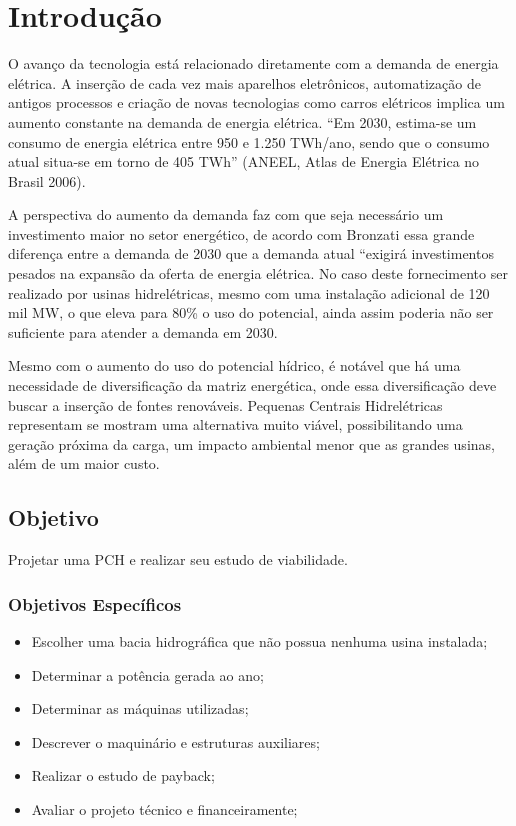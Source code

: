 
\chapter[Introdução]{Introdução}

O avanço da tecnologia está relacionado diretamente com a demanda de energia elétrica. A inserção de cada vez mais aparelhos eletrônicos, automatização de antigos processos e criação de novas tecnologias como carros elétricos implica um aumento constante na demanda de energia elétrica. “Em 2030, estima-se um consumo de energia elétrica entre 950 e 1.250 TWh/ano, sendo que o consumo atual situa-se em torno de 405 TWh” (ANEEL, Atlas de Energia Elétrica no Brasil 2006).

A perspectiva do aumento da demanda faz com que seja necessário um investimento maior no setor energético, de acordo com Bronzati essa grande diferença entre a demanda de 2030 que a demanda atual “exigirá investimentos pesados na expansão da oferta de energia elétrica. No caso deste fornecimento ser realizado por usinas hidrelétricas, mesmo com uma instalação adicional de 120 mil MW, o que eleva para 80\% o uso do potencial, ainda assim poderia não ser suficiente para atender a demanda em 2030.

Mesmo com o aumento do uso do potencial hídrico, é notável que há uma necessidade de diversificação da matriz energética, onde essa diversificação deve buscar a inserção de fontes renováveis. Pequenas Centrais Hidrelétricas representam se mostram uma alternativa muito viável, possibilitando uma geração próxima da carga, um impacto ambiental menor que as grandes usinas, além de um maior custo.



\section{Objetivo}\label{sec:obj}
Projetar uma PCH e realizar seu estudo de viabilidade.

\subsection{Objetivos Específicos}
\begin{itemize}
\item Escolher uma bacia hidrográfica que não possua nenhuma usina instalada;
\item Determinar a potência gerada ao ano;
\item Determinar as máquinas utilizadas;
\item Descrever o maquinário e estruturas auxiliares;
\item Realizar o estudo de payback;
\item Avaliar o projeto técnico e financeiramente;

\end{itemize}
